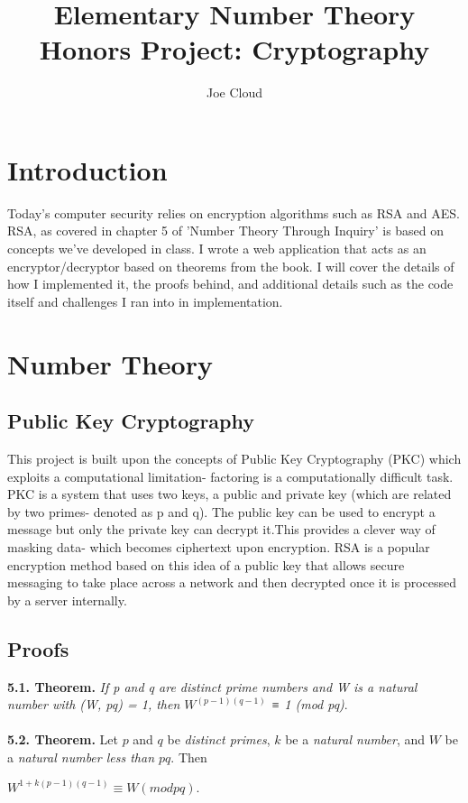 \documentclass[a4paper]{article}
\title{Elementary Number Theory Honors Project: Cryptography}
\author{Joe Cloud}
\begin{document}
\maketitle


\section{Introduction}

Today's computer security relies on encryption algorithms such as RSA and AES. RSA, as covered in chapter 5 of 'Number Theory Through Inquiry' is based on concepts we've developed in class. I wrote a web application that acts as an encryptor/decryptor based on theorems from the book. I will cover the details of how I implemented it, the proofs behind, and additional details such as the code itself and challenges I ran into in implementation.

\section{Number Theory}

\subsection{Public Key Cryptography}
This project is built upon the concepts of Public Key Cryptography (PKC) which exploits a computational limitation- factoring is a computationally difficult task. PKC is a system that uses two keys, a public and private key (which are related by two primes- denoted as p and q). The public key can be used to encrypt a message but only the private key can decrypt it.This provides a clever way of masking data- which becomes ciphertext upon encryption.  RSA is a popular encryption method based on this idea of a public key that allows secure messaging to take place across a network and then decrypted once it is processed by a server internally.

\subsection{Proofs}
\textbf{5.1. Theorem.} \textit{If p and q are distinct prime numbers and W is a natural number with (W, pq) = 1, then $W^{(p−1)(q−1)}$ ≡ 1 (mod pq)}. 
~\\ ~\\


\textbf{5.2. Theorem.} Let $p$ and $q$ be \textit{distinct primes}, $k$ be a \textit{natural number}, and $W$ be a \textit{natural
number less than $pq$}. Then
\begin{center} $W^{1+k(p−1)(q−1)} ≡ W(mod pq).$
\end{center}
~\\ ~\\ 
\end{document}

